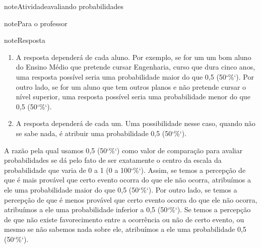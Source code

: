 \begin{sphinxadmonition}{note}{Atividade}{avaliando probabilidades}
\begin{sphinxadmonition}{note}{Para o professor}
\begin{sphinxadmonition}{note}{Resposta}
\begin{enumerate}
\begin{enumerate}
\item {} 
A resposta dependerá de cada aluno. Por exemplo, se for um um bom aluno do Ensino Médio que pretende cursar Engenharia, curso que dura cinco anos, uma resposta possível seria uma probabilidade maior do que 0,5 (50{}`\%{}`). Por outro lado, se for um aluno que tem outros planos e não pretende cursar o nível superior, uma resposta possível seria uma probabilidade menor do que 0,5 (50{}`\%{}`).

\item {} 
A resposta dependerá de cada um. Uma possibilidade nesse caso, quando não se sabe nada, é atribuir uma probabilidade 0,5 (50{}`\%{}`).

\end{enumerate}

\end{enumerate}

A razão pela qual usamos 0,5 (50{}`\%{}`) como valor de comparação para avaliar probabilidades se dá pelo fato de ser exatamente o centro da escala da probabilidade que varia de 0 a 1 (0 a 100{}`\%{}`). Assim, se temos a percepção de que é mais provável que certo evento ocorra do que ele não ocorra, atribuímos a ele uma probabilidade maior do que 0,5 (50{}`\%{}`). Por outro lado, se temos a percepção de que é menos provável que certo evento ocorra do que ele não ocorra, atribuímos a ele uma probabilidade inferior a 0,5 (50{}`\%{}`). Se temos a percepção de que não existe favorecimento entre a ocorrência ou não de certo evento, ou mesmo se não sabemos nada sobre ele, atribuímos a ele uma probabilidade 0,5 (50{}`\%{}`).
\end{sphinxadmonition}
\end{sphinxadmonition}


\end{sphinxadmonition}
